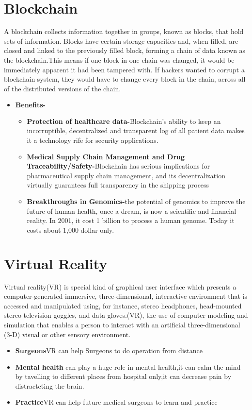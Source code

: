 \documentclass[12pt]{article}
\begin{document}
\section{Blockchain}

 A blockchain collects information together in groups, known as blocks, that hold sets of information. Blocks have certain storage capacities and, when filled, are closed and linked to the previously filled block, forming a chain of data known as the blockchain.This means if one block in one chain was changed, it would be immediately apparent it had been tampered with. If hackers wanted to corrupt a blockchain system, they would have to change every block in the chain, across all of the distributed versions of the chain.
 
 \begin{itemize}
 \item \textbf{Benefits-}
 \begin{itemize}
 \item \textbf{Protection of healthcare data-}Blockchain's ability to keep an incorruptible, decentralized and transparent log of all patient data makes it a technology rife for security applications.
 \item \textbf{Medical Supply Chain Management and Drug Traceability/Safety-}Blockchain has serious implications for pharmaceutical supply chain management, and its decentralization virtually guarantees full transparency in the shipping process
 \item \textbf{Breakthroughs in Genomics-}the potential of genomics to improve the future of human health, once a dream, is now a scientific and financial reality. In 2001, it cost 1 billion to process a human genome. Today it costs about 1,000 dollar only.
 \end{itemize}
 \end{itemize}
 \section{Virtual Reality}
 Virtual reality(VR) is special kind of graphical user interface which presents a computer-generated immersive, three-dimensional, interactive environment that is accessed and manipulated using, for instance, stereo headphones, head-mounted stereo television goggles, and data-gloves.(VR), the use of computer modeling and simulation that enables a person to interact with an artificial three-dimensional (3-D) visual or other sensory environment.
 
\begin{itemize}

\item \textbf{Surgeons}VR can help Surgeons to do operation from distance
\item \textbf{Mental health} can play a huge role in mental health,it can calm the mind by
tavelling to different places from hospital only,it can decrease pain by distractcting the brain.
\item \textbf{Practice}VR can help future medical surgeons to learn and practice




\end{itemize}
\end{document}
